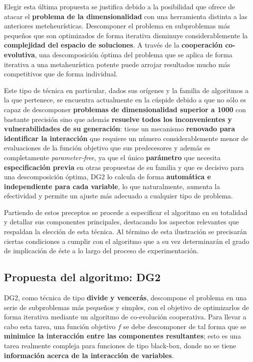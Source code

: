 Elegir esta última propuesta se justifica debido a la posibilidad que ofrece de atacar el \textbf{problema de la dimensionalidad} con una herramienta distinta a las anteriores meteheurísticas. Descomponer el problema en subproblemas más pequeños que son optimizados de forma iterativa disminuye considerablemente la \textbf{complejidad del espacio de soluciones}. A través de la \textbf{cooperación co-evolutiva}, una descomposición óptima del problema que se aplica de forma iterativa a una metaheurística potente puede arrojar resultados mucho más competitivos que de forma individual.

Este tipo de técnica en particular, dados sus orígenes y la familia de algoritmos a la que pertenece, se encuentra actualmente en la cúspide debido a que no sólo es capaz de descomponer \textbf{problemas de dimensionalidad superior a 1000} con bastante precisión sino que además \textbf{resuelve todos los inconvenientes y vulnerabilidades de su generación}: tiene un mecanismo \textbf{renovado para identificar la interacción} que requiere un número considerablemente menor de evaluaciones de la función objetivo que sus predecesores y además es completamente \textit{parameter-free}, ya que el único \textbf{parámetro} que necesita \textbf{especificación previa} en otras propuestas de su familia y que es decisivo para una descomposición óptima, DG2 lo calcula de forma \textbf{automática e independiente para cada variable}, lo que naturalmente, aumenta la efectividad y permite un ajuste más adecuado a cualquier tipo de problema.

Partiendo de estos preceptos se procede a especificar el algoritmo en su totalidad y detallar sus componentes principales, destacando los aspectos relevantes que respaldan la elección de esta técnica. Al término de esta ilustración se precisarán ciertas condiciones a cumplir con el algoritmo que a su vez determinarán el grado de implicación de éste a lo largo del proceso de experimentación.

\subsection{Propuesta del algoritmo: DG2}

DG2, como técnica de tipo \textbf{divide y vencerás}, descompone el problema en una serie de subproblemas más pequeños y simples, con el objetivo de optimizarlos de forma iterativa mediante un algoritmo de co-evolución cooperativa. Para llevar a cabo esta tarea, una función objetivo $f$ se debe descomponer de tal forma que se \textbf{minimice la interacción entre las componentes resultantes}; esto es una tarea realmente compleja para funciones de tipo black-box, donde no se tiene \textbf{información acerca de la interacción de variables}.

